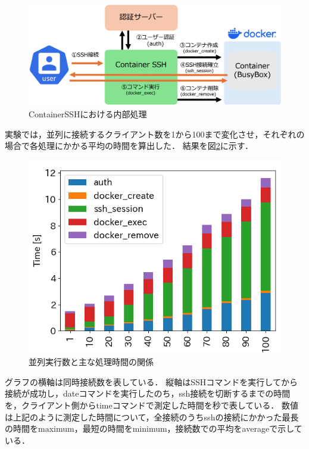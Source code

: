 \documentclass[dvipdfmx]{cs-handout}
\begin{document}
%
\begin{figure}[tb]
\includegraphics[width=\linewidth]{./fig/step.png}
\caption{ContainerSSHにおける内部処理}
\label{fig:step}
\end{figure}
%


実験では，並列に接続するクライアント数を1から100まで変化させ，それぞれの場合で各処理にかかる平均の時間を算出した．
結果を図\ref{fig:detail}に示す．
%
\begin{figure}[tb]
\includegraphics[width=0.9\linewidth]{./fig/detail.png}
\caption{並列実行数と主な処理時間の関係}
\label{fig:detail}
\end{figure}
%
グラフの横軸は同時接続数を表している．
縦軸はSSHコマンドを実行してから接続が成功し，dateコマンドを実行したのち，ssh接続を切断するまでの時間を，クライアント側からtimeコマンドで測定した時間を秒で表している．
数値は上記のように測定した時間について，全接続のうちsshの接続にかかった最長の時間をmaximum，最短の時間をminimum，接続数での平均をaverageで示している．
\end{document}
